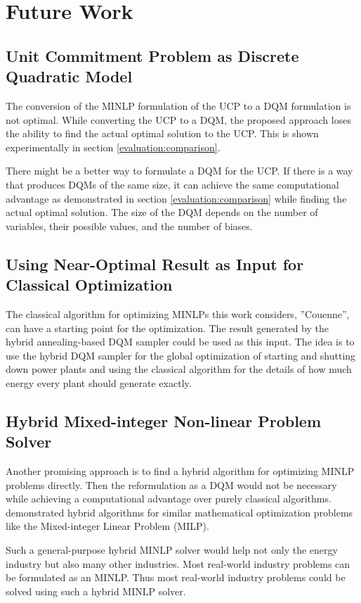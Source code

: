 \section{Future Work}

\subsection{Unit Commitment Problem as Discrete Quadratic Model}

The conversion of the MINLP formulation of the UCP to a DQM formulation is not optimal.
While converting the UCP to a DQM, the proposed approach loses the ability to find the actual optimal solution to the UCP.
This is shown experimentally in section \ref{evaluation:comparison}.

There might be a better way to formulate a DQM for the UCP.
If there is a way that produces DQMs of the same size, it can achieve the same computational advantage as demonstrated in section \ref{evaluation:comparison} while finding the actual optimal solution.
The size of the DQM depends on the number of variables, their possible values, and the number of biases.

\subsection{Using Near-Optimal Result as Input for Classical Optimization}

The classical algorithm for optimizing MINLPs this work considers, ''Couenne'', can have a starting point for the optimization.
The result generated by the hybrid annealing-based DQM sampler could be used as this input.
The idea is to use the hybrid DQM sampler for the global optimization of starting and shutting down power plants and using the classical algorithm for the details of how much energy every plant should generate exactly.

\subsection{Hybrid Mixed-integer Non-linear Problem Solver}

Another promising approach is to find a hybrid algorithm for optimizing MINLP problems directly.
Then the reformulation as a DQM would not be necessary while achieving a computational advantage over purely classical algorithms.
\citeauthor{Ajagekar2020} demonstrated hybrid algorithms for similar mathematical optimization problems like the Mixed-integer Linear Problem (MILP).
\cite{Ajagekar2020}

Such a general-purpose hybrid MINLP solver would help not only the energy industry but also many other industries.
Most real-world industry problems can be formulated as an MINLP.
\cite{Belotti2009}
Thus most real-world industry problems could be solved using such a hybrid MINLP solver.
